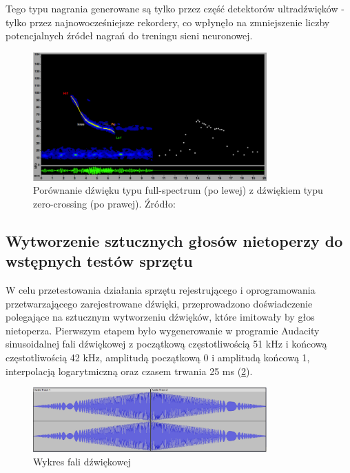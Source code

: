\documentclass{sprz}
\begin{document}
Tego typu nagrania generowane są tylko przez część detektorów ultradźwięków - tylko przez najnowocześniejsze rekordery, co wpłynęło na zmniejszenie liczby potencjalnych źródeł nagrań do treningu sieni neuronowej.

\begin{figure}[h]
  \centering
  \includegraphics[width=0.8\textwidth]{sprz/fullspectrum.png}
  \caption{Porównanie dźwięku typu full-spectrum (po lewej) z dźwiękiem typu zero-crossing (po prawej). Źródło: \cite{fullspectrum}}
  \label{img:fullspectrum}
\end{figure} 

\subsection{Wytworzenie sztucznych głosów nietoperzy do wstępnych testów sprzętu}

W celu przetestowania działania sprzętu rejestrującego i oprogramowania przetwarzającego zarejestrowane dźwięki, przeprowadzono doświadczenie polegające na sztucznym wytworzeniu dźwięków, które imitowały by głos nietoperza.
Pierwszym etapem było wygenerowanie w programie Audacity sinusoidalnej fali dźwiękowej z początkową częstotliwością 51 kHz i końcową częstotliwością 42 kHz, amplitudą początkową 0 i amplitudą końcową 1, interpolacją logarytmiczną oraz czasem trwania 25 ms (\ref{img:wykres_fali}).

\begin{figure}[h]
    \centering
    \includegraphics[width=0.8\textwidth]{sprz/wykres_fali}
    \caption{Wykres fali dźwiękowej}
    \label{img:wykres_fali}
\end{figure}
\end{document}

